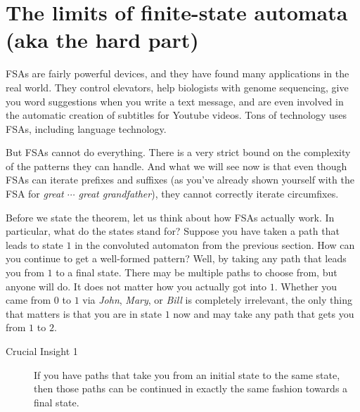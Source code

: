 \section{The limits of finite-state automata (aka the hard part)}

FSAs are fairly powerful devices, and they have found many applications in the real world.
They control elevators, help biologists with genome sequencing, give you word suggestions when you write a text message, and are even involved in the automatic creation of subtitles for Youtube videos.
Tons of technology uses FSAs, including language technology.

But FSAs cannot do everything.
There is a very strict bound on the complexity of the patterns they can handle.
And what we will see now is that even though FSAs can iterate prefixes and suffixes (as you've already shown yourself with the FSA for \emph{great $\cdots$ great grandfather}), they cannot correctly iterate circumfixes.

Before we state the theorem, let us think about how FSAs actually work.
In particular, what do the states stand for?
Suppose you have taken a path that leads to state $1$ in the convoluted automaton from the previous section.
How can you continue to get a well-formed pattern?
Well, by taking any path that leads you from $1$ to a final state.
There may be multiple paths to choose from, but anyone will do.
It does not matter how you actually got into $1$.
Whether you came from $0$ to $1$ via \emph{John}, \emph{Mary}, or \emph{Bill} is completely irrelevant, the only thing that matters is that you are in state $1$ now and may take any path that gets you from $1$ to $2$.
%
\begin{description}
    \item[Crucial Insight 1]
        If you have paths that take you from an initial state to the same state, then those paths can be continued in exactly the same fashion towards a final state.
\end{description}

